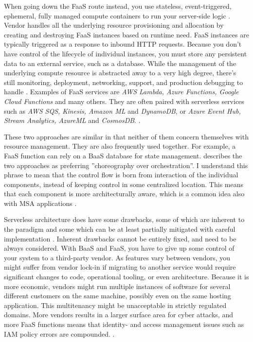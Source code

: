\documentclass[utf8,english]{gradu3}
\begin{document}
When going down the FaaS route instead, you use stateless, event-triggered,
ephemeral, fully managed compute containers to run your server-side logic
\parencite{Roberts2018}. Vendor handles all the underlying resource provisioning
and allocation by creating and destroying FaaS instances based on runtime need.
FaaS instances are typically triggered as a response to inbound HTTP requests. Because you
don't have control of the lifecycle of individual instances, you must store any
persistent data to an external service, such as a database. While the management
of the underlying compute resource is abstracted away to a very high degree,
there's still monitoring, deployment, networking, support, and production
debugging to handle \parencite{Roberts2018}. Examples of FaaS services are
\textit{AWS Lambda, Azure Functions, Google Cloud Functions} and many others.
They are often paired with serverless services such as \textit{AWS SQS, Kinesis,
  Amazon ML} and \textit{DynamoDB}, or \textit{Azure Event Hub, Stream Analytics,
  AzureML} and \textit{CosmosDB}.  \parencite[17]{Gannon2017}.

These two approaches are similar in that neither of them concern themselves with
resource management. They are also frequently used together. For example, a FaaS
function can rely on a BaaS database for state management.
\textcite{Roberts2018} describes the two approaches as preferring ''choreography over
orchestration''. I understand this phrase to mean that the control flow is born
from interaction of the individual components, instead of keeping control in some
centralized location.  This means that each component is more
architecturally aware, which is a common idea also with MSA applications
\parencite{Roberts2018}.

Serverless architecture does have some drawbacks, some of which are inherent to
the paradigm and some which can be at least partially mitigated with careful
implementation \parencite{Roberts2018}. Inherent drawbacks cannot be
entirely fixed, and need to be always considered. With BaaS and FaaS, you have
to give up some control of your system to a third-party vendor. As features vary
between vendors, you might suffer from vendor lock-in if migrating to another
service would require significant changes to code, operational tooling, or even
architecture. Because it is more economic, vendors might run multiple instances
of software for several different customers on the same machine, possibly even
on the same hosting application. This multitenancy might be unacceptable in
strictly regulated domains. More vendors results in a larger surface area for
cyber attacks, and more FaaS functions means that identity- and access
management issues such as IAM policy errors are compounded.
\parencite{Roberts2018}.
\end{document}
